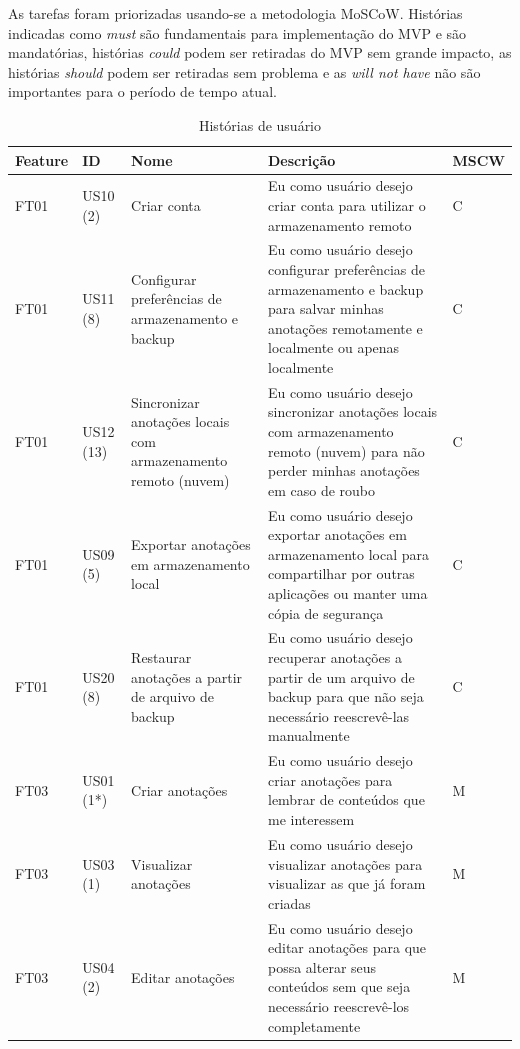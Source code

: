 \documentclass[
	12pt,				%
	oneside,			%
	a4paper,			%
	english,			%
	brazil,				%
	]{abntex2}
\begin{document}
As tarefas foram priorizadas usando-se a metodologia MoSCoW. Histórias indicadas como \textit{must} são fundamentais para implementação do MVP e são mandatórias, histórias \textit{could} podem ser retiradas do MVP sem grande impacto, as histórias \textit{should} podem ser retiradas sem problema e as \textit{will not have} não são importantes para o período de tempo atual.

\IBGEtabfontsize
\begin{longtable}{@{}p{}p{}p{}p{}p{}@{}}
\caption{Histórias de usuário}
\label{tab:historias_de_usuario} \\
\toprule
\textbf{Feature} & \textbf{ID} & \textbf{Nome} & \textbf{Descrição} & \textbf{MSCW} \\ \midrule
FT01 & US10 (2) & Criar conta & Eu como usuário desejo criar conta para utilizar o armazenamento remoto & C\\ \midrule
FT01 & US11 (8) & Configurar preferências de armazenamento e backup & Eu como usuário desejo configurar preferências de armazenamento e backup para salvar minhas anotações remotamente e localmente ou apenas localmente & C\\ \midrule
FT01 & US12 (13) & Sincronizar anotações locais com armazenamento remoto (nuvem) & Eu como usuário desejo sincronizar anotações locais com armazenamento remoto (nuvem) para não perder minhas anotações em caso de roubo & C\\ \midrule
FT01 & US09 (5) & Exportar anotações em armazenamento local & Eu como usuário desejo exportar anotações em armazenamento local para compartilhar por outras aplicações ou manter uma cópia de segurança & C\\ \midrule
FT01 & US20 (8) & Restaurar anotações a partir de arquivo de backup & Eu como usuário desejo recuperar anotações a partir de um arquivo de backup para que não seja necessário reescrevê-las manualmente & C\\ \midrule
FT03 & US01 (1*) & Criar anotações & Eu como usuário desejo criar anotações para lembrar de conteúdos que me interessem & M\\ \midrule
FT03 & US03 (1) & Visualizar anotações & Eu como usuário desejo visualizar anotações para visualizar as que já foram criadas & M\\ \midrule
FT03 & US04 (2) & Editar anotações & Eu como usuário desejo editar anotações para que possa alterar seus conteúdos sem que seja necessário reescrevê-los completamente & M\\ \midrule

\end{longtable}
\end{document}
